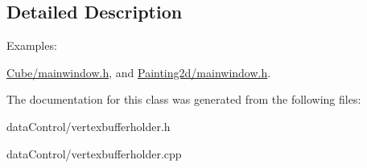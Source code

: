 \subsection{Detailed Description}
\begin{Desc}
\item[Examples\+: ]\par
\hyperlink{_cube_2mainwindow_8h-example}{Cube/mainwindow.\+h}, and \hyperlink{_painting2d_2mainwindow_8h-example}{Painting2d/mainwindow.\+h}.\end{Desc}


The documentation for this class was generated from the following files\+:\begin{DoxyCompactItemize}
\item 
data\+Control/vertexbufferholder.\+h\item 
data\+Control/vertexbufferholder.\+cpp\end{DoxyCompactItemize}

